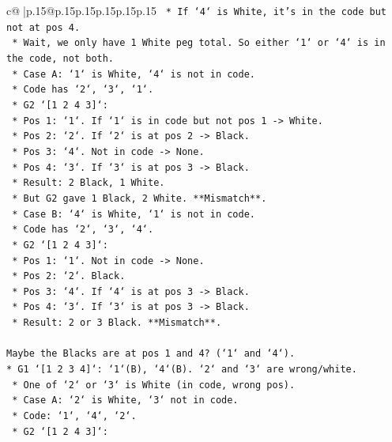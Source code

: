 \documentclass{article}
\begin{document}
{\begin{supertabular}{c@{$\;$}|p{.15\linewidth}@{}p{.15\linewidth}p{.15\linewidth}p{.15\linewidth}p{.15\linewidth}p{.15\linewidth}}
{{{\texttt{    *   If `4` is White, it's in the code but not at pos 4.} \\
\texttt{    *   Wait, we only have 1 White peg total. So either `1` or `4` is in the code, not both.} \\
\texttt{    *   Case A: `1` is White, `4` is not in code.} \\
\texttt{        *   Code has `2`, `3`, `1`.} \\
\texttt{        *   G2 `{[}1 2 4 3{]}`:} \\
\texttt{            *   Pos 1: `1`. If `1` is in code but not pos 1 {-}> White.} \\
\texttt{            *   Pos 2: `2`. If `2` is at pos 2 {-}> Black.} \\
\texttt{            *   Pos 3: `4`. Not in code {-}> None.} \\
\texttt{            *   Pos 4: `3`. If `3` is at pos 3 {-}> Black.} \\
\texttt{            *   Result: 2 Black, 1 White.} \\
\texttt{            *   But G2 gave 1 Black, 2 White. **Mismatch**.} \\
\texttt{    *   Case B: `4` is White, `1` is not in code.} \\
\texttt{        *   Code has `2`, `3`, `4`.} \\
\texttt{        *   G2 `{[}1 2 4 3{]}`:} \\
\texttt{            *   Pos 1: `1`. Not in code {-}> None.} \\
\texttt{            *   Pos 2: `2`. Black.} \\
\texttt{            *   Pos 3: `4`. If `4` is at pos 3 {-}> Black.} \\
\texttt{            *   Pos 4: `3`. If `3` is at pos 3 {-}> Black.} \\
\texttt{            *   Result: 2 or 3 Black. **Mismatch**.} \\
\\ 
\texttt{Maybe the Blacks are at pos 1 and 4? (`1` and `4`).} \\
\texttt{*   G1 `{[}1 2 3 4{]}`: `1`(B), `4`(B). `2` and `3` are wrong/white.} \\
\texttt{    *   One of `2` or `3` is White (in code, wrong pos).} \\
\texttt{    *   Case A: `2` is White, `3` not in code.} \\
\texttt{        *   Code: `1`, `4`, `2`.} \\
\texttt{        *   G2 `{[}1 2 4 3{]}`:} \\
}}}
\end{supertabular}}
\end{document}
